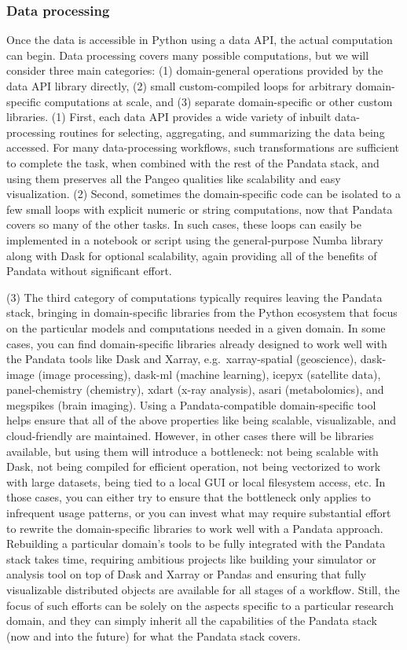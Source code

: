 \subsubsection{Data processing}

Once the data is accessible in Python using a data API, the actual computation can begin. Data processing covers many possible computations, but we will consider three main categories: (1) domain-general operations provided by the data API library directly, (2) small custom-compiled loops for arbitrary domain-specific computations at scale, and (3) separate domain-specific or other custom libraries. (1) First, each data API provides a wide variety of inbuilt data-processing routines for selecting, aggregating, and summarizing the data being accessed. For many data-processing workflows, such transformations are sufficient to complete the task, when combined with the rest of the Pandata stack, and using them preserves all the Pangeo qualities like scalability and easy visualization. (2) Second, sometimes the domain-specific code can be isolated to a few small loops with explicit numeric or string computations, now that Pandata covers so many of the other tasks. In such cases, these loops can easily be implemented in a notebook or script using the general-purpose Numba library along with Dask for optional scalability, again providing all of the benefits of Pandata without significant effort.

(3) The third category of computations typically requires leaving the Pandata stack, bringing in domain-specific libraries from the Python ecosystem that focus on the particular models and computations needed in a given domain. In some cases, you can find domain-specific libraries already designed to work well with the Pandata tools like Dask and Xarray, e.g.\ xarray-spatial (geoscience), dask-image (image processing), dask-ml (machine learning), icepyx (satellite data), panel-chemistry (chemistry), xdart (x-ray analysis), asari (metabolomics), and megspikes (brain imaging). Using a Pandata-compatible domain-specific tool helps ensure that all of the above properties like being scalable, visualizable, and cloud-friendly are maintained. However, in other cases there will be libraries available, but using them will introduce a bottleneck: not being scalable with Dask, not being compiled for efficient operation, not being vectorized to work with large datasets, being tied to a local GUI or local filesystem access, etc. In those cases, you can either try to ensure that the bottleneck only applies to infrequent usage patterns, or you can invest what may require substantial effort to rewrite the domain-specific libraries to work well with a Pandata approach. Rebuilding a particular domain's tools to be fully integrated with the Pandata stack takes time, requiring ambitious projects like building your simulator or analysis tool on top of Dask and Xarray or Pandas and ensuring that fully visualizable distributed objects are available for all stages of a workflow. Still, the focus of such efforts can be solely on the aspects specific to a particular research domain, and they can simply inherit all the capabilities of the Pandata stack (now and into the future) for what the Pandata stack covers.

